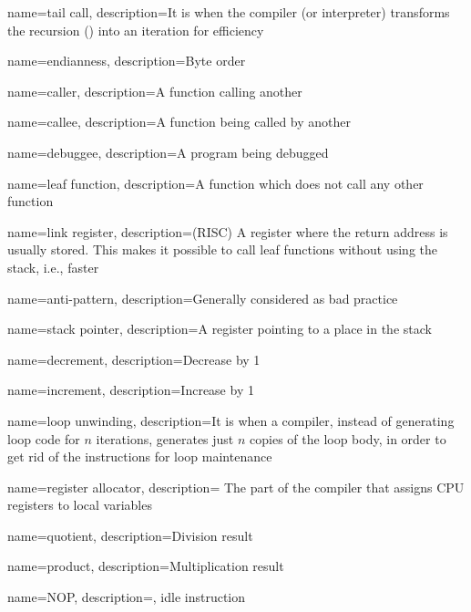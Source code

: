 {
  name=tail call,
  description={It is when the compiler (or interpreter) transforms the recursion
  () into an iteration for efficiency}
}

{
  name=endianness,
  description={Byte order}
}

{
  name=caller,
  description={A function calling another}
}

{
  name=callee,
  description={A function being called by another}
}

{
  name=debuggee,
  description={A program being debugged}
}

{
  name=leaf function,
  description={A function which does not call any other function}
}

{
  name=link register,
  description=(RISC) {A register where the return address is usually stored.
  This makes it possible to call leaf functions without using the stack, i.e., faster}
}

{
  name=anti-pattern,
  description={Generally considered as bad practice}
}

{
  name=stack pointer,
  description={A register pointing to a place in the stack}
}

{
  name=decrement,
  description={Decrease by 1}
}

{
  name=increment,
  description={Increase by 1}
}

{
  name=loop unwinding,
  description={It is when a compiler, instead of generating loop code for $n$ iterations, generates just $n$ copies of the
  loop body, in order to get rid of the instructions for loop maintenance}
}

{
  name=register allocator,
  description=
  {The part of the compiler that assigns CPU registers to local variables}
}

{
  name=quotient,
  description={Division result}
}

{
  name=product,
  description={Multiplication result}
}

{
  name=NOP,
  description={, idle instruction}
}

